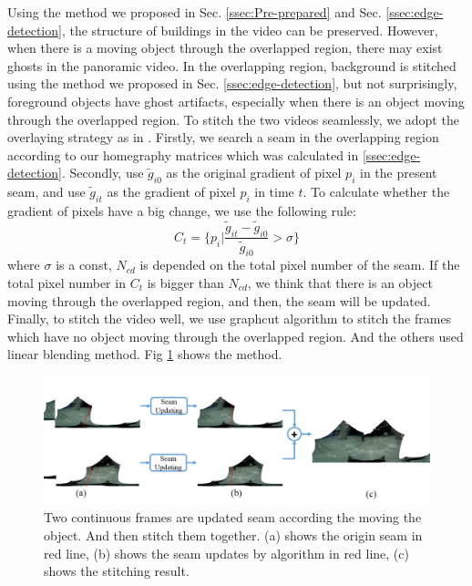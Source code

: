 \documentclass[conference]{IEEEtran}
\begin{document}
Using the method we proposed in Sec. \ref{ssec:Pre-prepared} and Sec. \ref{ssec:edge-detection}, the structure of buildings in the video can be preserved. However, when there is a moving object
through the overlapped region, there may exist ghosts in the panoramic video. 
In the overlapping region, background is stitched using the method we proposed in Sec. \ref{ssec:edge-detection}, but not surprisingly, 
foreground objects have ghost artifacts, especially when there is an object moving through the overlapped region. To stitch the
two videos seamlessly, we adopt the overlaying strategy as in \cite{he2016parallax}. Firstly, we search a seam in the overlapping region according to our homegraphy matrices which was calculated in \ref{ssec:edge-detection}.
Secondly, use $\widetilde{g}_{i0}$ as the original gradient of pixel $p_i$ in the present seam, and use $\widetilde{g}_{it}$ as the gradient of pixel $p_i$ in time $t$. To calculate whether the gradient
of pixels have a big change, we use the following rule:
$$
\textit{C}_{t}=\{p_{i}|\frac{\widetilde{g}_{it}-\widetilde{g}_{i0}}{\widetilde{g}_{i0}}>\sigma\}
$$
where $\sigma$ is a const, $\textit{N}_{cd}$ is depended on the total pixel number of the seam. If the total pixel number in $\textit{C}_t$ is bigger than $\textit{N}_{cd}$, we think that there is an object moving through the overlapped region, and then, the seam will be updated.
Finally, to stitch the video well, we use graphcut algorithm \cite{boykov2004experimental} to stitch the frames which have no object moving through the overlapped region. And the others used linear blending method.
Fig \ref{fig:p24} shows the method.
\begin{figure}[h]
\centering
\includegraphics[scale=0.21]{picture43.png}
\caption{Two continuous frames are updated seam according the moving the object. And then stitch them together. (a) shows the origin seam in red line, (b) shows the seam updates 
by algorithm \cite{he2016parallax} in red line,
(c) shows the stitching result.}
\label{fig:p24}
\end{figure}
\end{document}
